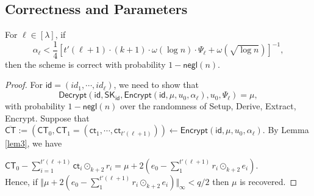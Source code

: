 \documentclass[runningheads]{llncs}
\begin{document}
\subsection{Correctness and Parameters} \label{params}
\begin{lemma}[Correctness] For $\ell \in [\lambda]$, if 
\begin{equation}\label{k21}
	\alpha_\ell <\frac{1}{4} \left[t'(\ell+1)\cdot(k+1)\cdot \omega(\log n)\cdot \Psi_\ell   +\omega(\sqrt{\log n})\right]^{-1},
\end{equation}
	 then the scheme is correct with probability $1-\mathsf{negl}(n)$.
\end{lemma}
\begin{proof}
For $\textsf{id}=(id_1, \cdots, id_\ell)$, we need to show that 
$$\textsf{Decrypt}(\mathsf{id}, \mathsf{SK}_\mathsf{id},\textsf{Encrypt}(\mathsf{id},\mu, u_0, \alpha_\ell),u_0, \Psi_\ell)=\mu,$$
 with probability $1-\textsf{negl}(n)$ over the randomness of \textsf{Setup}, \textsf{Derive}, \textsf{Extract}, \textsf{Encrypt}.
Suppose that  $\overline{\mathsf{CT}}:=(\mathsf{CT}_0, \mathsf{CT}_1=(\textsf{ct}_1, \cdots, \textsf{ct}_{t'(\ell+1)})) \leftarrow \textsf{Encrypt}(\mathsf{id},\mu, u_0, \alpha_\ell).$ By Lemma \ref{lem3}, we have

\iffalse 
\begin{equation}\label{k3}
\begin{split}
\mathsf{CT}_{0}
&=\mu+(\sum_{1}^{t}r_i\cdot f_i) \odot_{k+2} s+(\sum_{t+1}^{t'(\ell+1)}r_i\cdot f_i) \odot_{k+2} s+2e_0\\
&=\mu + \sum_{1}^{t}r_i\odot_{k+2} (\textsf{ct}_i -2e_i)+\sum_{t+1}^{t'(\ell+1)}r_i\odot_{k+2} (\textsf{ct}_i -2e_i)+2e_0.
\end{split}
\end{equation}

\fi 
 $\mathsf{CT}_{0}-\sum_{i=1}^{t'(\ell+1)} \textsf{ct}_{i}\odot_{k+2} r_i =\mu+2(e_0-\sum_{1}^{t'(\ell+1)}r_i\odot_{k+2} e_i)$. \\
  Hence, 
if $\Vert \mu+2(e_0-\sum_{1}^{t'(\ell+1)}r_i\odot_{k+2} e_i)\Vert_{\infty}< q/2$ then $\mu $ is recovered.


\end{proof}
\end{document}
